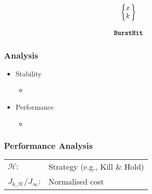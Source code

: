 \begin{frame}
    \vspace{1cm}

    \large
    \begin{equation*}
        \begin{matrix}
            \left\{\begin{matrix}
                x \\
                k
            \end{matrix}\,\right\} \\
                                 \\
            \texttt{\textbf{BurstHit}}
        \end{matrix}
    \end{equation*}
\end{frame}

\begin{frame}
    \frametitle{Analysis}
    \begin{itemize}
        \item Stability
            \begin{itemize}
                \item 
            \end{itemize}
        \item Performance
            \begin{itemize}
                \item 
            \end{itemize}
    \end{itemize}
\end{frame}


\begin{frame}
    \frametitle{Performance Analysis}
    \begin{figure}[h]
        \centering
        
    \end{figure}

    \centering
    \begin{tabular}{l l}
        $\mathcal{H}:$ & Strategy (e.g., Kill \& Hold)\\
        $J_{k,\mathcal{H}}/J_\infty$: & Normalised cost \\
    \end{tabular}
\end{frame}




